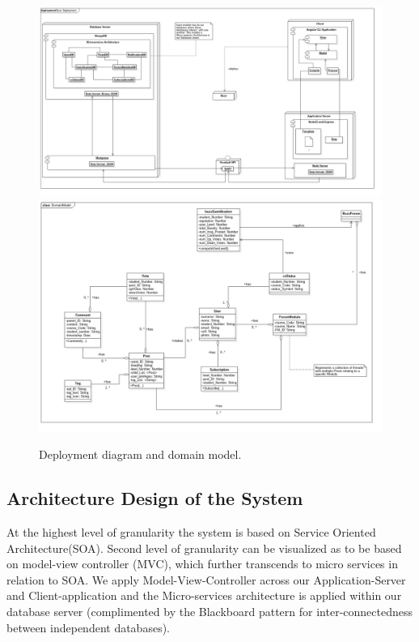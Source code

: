 \documentclass[12pt]{article}
\begin{document}
\begin{figure}[h!]
\includegraphics[width=\linewidth]{Diagrams/Deployment.jpg}
\includegraphics[width=\linewidth]{Diagrams/Domain.jpg}
\caption{Deployment diagram and domain model.}
\label{Use-case: Users Module}
\end{figure}

\newpage 
\subsection{Architecture Design of the System}
\par{At the highest level of granularity the system is based on Service Oriented Architecture(SOA). Second  level of granularity can be visualized as to be based on model-view controller (MVC), which further transcends to micro services in relation to SOA. We apply Model-View-Controller across our Application-Server and Client-application and the Micro-services architecture is applied within our database server (complimented by the Blackboard pattern for inter-connectedness between independent databases).}
\end{document}
